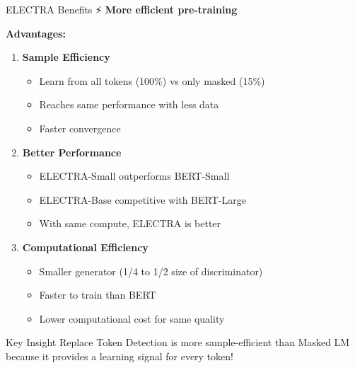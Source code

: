 \documentclass[aspectratio=169]{beamer}
\begin{document}
\begin{frame}[shrink=10]{ELECTRA Benefits ⚡}
\small
\textbf{More efficient pre-training}

\vspace{1em}

\textbf{Advantages:}
\begin{enumerate}\setlength{\itemsep}{0pt}
    \item \textbf{Sample Efficiency}
    \begin{itemize}\setlength{\itemsep}{0pt}
        \item Learn from all tokens (100\%) vs only masked (15\%)
        \item Reaches same performance with less data
        \item Faster convergence
    \end{itemize}

    \vspace{0.5em}

    \item \textbf{Better Performance}
    \begin{itemize}\setlength{\itemsep}{0pt}
        \item ELECTRA-Small outperforms BERT-Small
        \item ELECTRA-Base competitive with BERT-Large
        \item With same compute, ELECTRA is better
    \end{itemize}

    \vspace{0.5em}

    \item \textbf{Computational Efficiency}
    \begin{itemize}\setlength{\itemsep}{0pt}
        \item Smaller generator (1/4 to 1/2 size of discriminator)
        \item Faster to train than BERT
        \item Lower computational cost for same quality
    \end{itemize}
\end{enumerate}

\vspace{1em}

\begin{block}{Key Insight}
Replace Token Detection is more sample-efficient than Masked LM because it provides a learning signal for every token!
\end{block}
\end{frame}
\end{document}
